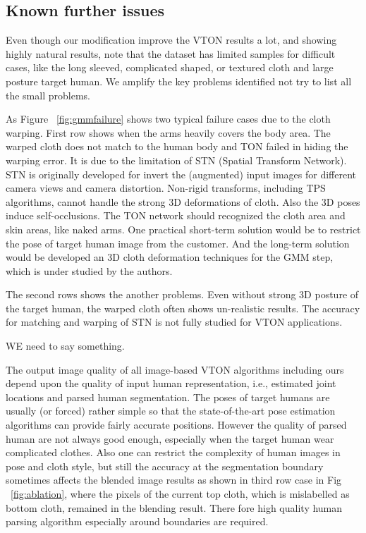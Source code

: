 \subsection{Known further issues}


Even though our modification  improve the VTON results a lot, and showing highly natural results, note that the dataset has limited samples for difficult cases, like the long sleeved, complicated shaped, or textured cloth and large posture target human. We amplify the key problems identified not try to list all the small problems. 

As Figure ~\ref{fig:gmmfailure} shows two typical failure cases due to the cloth warping. First row shows when the arms heavily covers the body area. The warped cloth does not match to the human body and TON failed in hiding the warping error. It is due to the limitation of STN (Spatial Transform Network). STN is originally developed for invert the (augmented) input images for different camera views and camera distortion. Non-rigid transforms, including TPS algorithms, cannot handle the strong 3D deformations of cloth.  Also the 3D poses induce self-occlusions. The TON network should recognized the cloth area and skin areas, like naked arms. One practical short-term solution would be to restrict the pose of target human image from the customer. And the long-term solution would be developed an 3D cloth deformation techniques for the GMM step, which is under studied by the authors. 

The second rows shows the another problems. Even without strong 3D posture of the target human, the warped cloth often shows un-realistic results. The accuracy for matching and warping of STN is not fully studied for VTON applications. 

WE need to say something.
    

The output image quality of all image-based VTON algorithms including ours depend upon the quality of input human representation, i.e., estimated joint locations and parsed human segmentation. The poses of target humans are usually (or forced) rather simple so that the state-of-the-art pose estimation algorithms can provide fairly accurate positions. However the quality of parsed human are not always good enough, especially when the target human wear complicated clothes. Also one can restrict the complexity of human images in pose and cloth style, but still the accuracy at the segmentation boundary sometimes affects the blended image results as shown in third row case in Fig ~\ref{fig:ablation}, where the pixels of the current top cloth, which is mislabelled as bottom cloth, remained in the blending result. There fore high quality human parsing algorithm especially around boundaries are required.   


